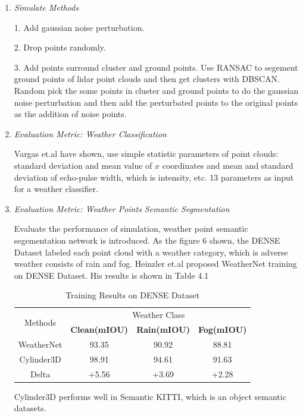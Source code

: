 \begin{enumerate}
 \item \textit{Simulate Methods}
 
 1. Add gaussian noise perturbation.

2. Drop points randomly.

3. Add points surround cluster and ground points. Use RANSAC to segement ground points of lidar point clouds and then get clusters with DBSCAN. Random pick the some points in cluster and ground points to do the gaussian noise perturbation and then add the perturbated points to the original points as the addition of noise points.
 
 \item \textit{Evaluation Metric: Weather Classification} 
 
 Vargas et.al\cite{vargas_rivero_weather_2020} have shown, use simple statistic parameters of point clouds: standard deviation and mean value of \(x\) coordinates and mean and standard deviation of echo-pulse width, which is intensity, etc. 13 parameters as input for a weather classifier.
 \item \textit{Evaluation Metric: Weather Points Semantic Segmentation}
 
 
 Evaluate the performance of simulation, weather point semantic segementation network is introduced. As the figure 6 shown, the DENSE Dataset labeled each point cloud with a weather category, which is adverse weather consists of rain and fog. Heinzler et.al \cite{heinzler_cnn-based_2020} proposed WeatherNet training on DENSE Dataset. His results is shown in Table 4.1
 \begin{table}[h!]
  \begin{center}
    \caption{Training Results on DENSE Dataset}
    \begin{tabular}{|c|c|c|c|} %
      \hline
      \multirow{2}{*}{Methods} & \multicolumn{3}{c|}{Weather Class}\\
    \cline{2-4}
       &\textbf{Clean(mIOU)} & \textbf{Rain(mIOU)}& \textbf{Fog(mIOU)}\\
      \hline
      WeatherNet & 93.35 & 90.92&88.81\\
      Cylinder3D & 98.91 & 94.61&91.63\\
      \color{blue}
      Delta & \color{blue}+5.56 & \color{blue}+3.69&\color{blue}+2.28\\
    \hline
    \end{tabular}
  \end{center}
\end{table}
Cylinder3D\cite{zhu_cylindrical_2020} performs well in Semantic KITTI\cite{behley_semantickitti_2019}, which is an object semantic datasets. 
\end{enumerate}
